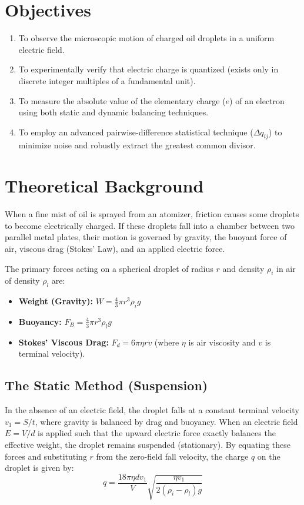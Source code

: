 \documentclass[a4paper,11pt]{article}
\begin{document}
\section{Objectives}
\begin{enumerate}
    \item To observe the microscopic motion of charged oil droplets in a uniform electric field.
    \item To experimentally verify that electric charge is quantized (exists only in discrete integer multiples of a fundamental unit).
    \item To measure the absolute value of the elementary charge ($e$) of an electron using both static and dynamic balancing techniques.
    \item To employ an advanced pairwise-difference statistical technique ($\Delta q_{ij}$) to minimize noise and robustly extract the greatest common divisor.
\end{enumerate}

\section{Theoretical Background}
When a fine mist of oil is sprayed from an atomizer, friction causes some droplets to become electrically charged. If these droplets fall into a chamber between two parallel metal plates, their motion is governed by gravity, the buoyant force of air, viscous drag (Stokes' Law), and an applied electric force.

The primary forces acting on a spherical droplet of radius $r$ and density $\rho_i$ in air of density $\rho_l$ are:
\begin{itemize}
    \item \textbf{Weight (Gravity):} $W = \frac{4}{3}\pi r^3 \rho_i g$
    \item \textbf{Buoyancy:} $F_B = \frac{4}{3}\pi r^3 \rho_l g$
    \item \textbf{Stokes' Viscous Drag:} $F_d = 6\pi \eta r v$ (where $\eta$ is air viscosity and $v$ is terminal velocity).
\end{itemize}

\subsection{The Static Method (Suspension)}
In the absence of an electric field, the droplet falls at a constant terminal velocity $v_1 = S/t$, where gravity is balanced by drag and buoyancy.
When an electric field $E = V/d$ is applied such that the upward electric force exactly balances the effective weight, the droplet remains suspended (stationary). By equating these forces and substituting $r$ from the zero-field fall velocity, the charge $q$ on the droplet is given by:
\begin{equation} \label{eq:static}
    q = \frac{18\pi \eta d v_1}{V} \sqrt{\frac{\eta v_1}{2(\rho_i - \rho_l)g}}
\end{equation}
\end{document}
